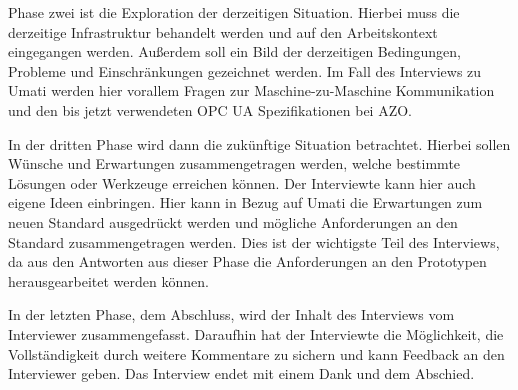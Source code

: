 \documentclass[a4paper, 12pt, oneside]{scrbook}
\begin{document}
	Phase zwei ist die Exploration der derzeitigen Situation. Hierbei muss die derzeitige Infrastruktur behandelt werden und auf den Arbeitskontext eingegangen werden. Außerdem soll ein Bild der derzeitigen Bedingungen, Probleme und Einschränkungen gezeichnet werden. Im Fall des Interviews zu Umati werden hier vorallem Fragen zur Maschine-zu-Maschine Kommunikation und den bis jetzt verwendeten OPC UA Spezifikationen bei AZO. \cite{wesel_semi-strukturierte_2010}
	
	In der dritten Phase wird dann die zukünftige Situation betrachtet. Hierbei sollen Wünsche und Erwartungen zusammengetragen werden, welche bestimmte Lösungen oder Werkzeuge erreichen können. Der Interviewte kann hier auch eigene Ideen einbringen. Hier kann in Bezug auf Umati die Erwartungen zum neuen Standard ausgedrückt werden und mögliche Anforderungen an den Standard zusammengetragen werden. Dies ist der wichtigste Teil des Interviews, da aus den Antworten aus dieser Phase die Anforderungen an den Prototypen herausgearbeitet werden können. \cite{wesel_semi-strukturierte_2010}
	
	In der letzten Phase, dem Abschluss, wird der Inhalt des Interviews vom Interviewer zusammengefasst. Daraufhin hat der Interviewte die Möglichkeit, die Vollständigkeit durch weitere Kommentare zu sichern und kann Feedback an den Interviewer geben. Das Interview endet mit einem Dank und dem Abschied. \cite{wesel_semi-strukturierte_2010}
	
	
\end{document}
